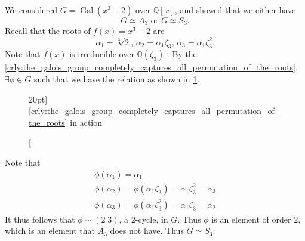 \documentclass[notoc,notitlepage,nobib]{tufte-book}
\DeclareMathOperator{\Gal}{Gal}
\begin{document}
\begin{eg}
  We considered $G = \Gal(x^3 - 2)$ over $\mathbb{Q}[x]$, and showed that we
  either have
  \begin{equation*}
    G \simeq A_3 \text{ or } G \simeq S_3.
  \end{equation*}
  Recall that the roots of $f(x) = x^3 - 2$ are
  \begin{equation*}
    \alpha_1 = \sqrt[3]{2}, \, \alpha_2 = \alpha_1 \zeta_3, \, \alpha_3 =
    \alpha_1 \zeta_3^2.
  \end{equation*}
  Note that $f(x)$ is irreducible over $\mathbb{Q}(\zeta_3)$ . By the
  \cref{crly:the_galois_group_completely_captures_all_permutation_of_the_roots},
  $\exists \phi \in G$ such that we have the relation as shown in
  \cref{fig:crly_galois_group_has_all_permutations_in_action}.
  \begin{figure}[ht]
    \centering
    \caption[][20pt]{\cref{crly:the_galois_group_completely_captures_all_permutation_of_the_roots} in action}
    \label{fig:crly_galois_group_has_all_permutations_in_action}
  \end{figure}

   Note that
  \begin{gather*}
    \phi(\alpha_1) = \alpha_1 \\
    \phi(\alpha_2) = \phi(\alpha_1 \zeta_3) = \alpha_1 \zeta_3^2 = \alpha_3 \\
    \phi(\alpha_3) = \phi(\alpha_1 \zeta_3^2) = \alpha_1 \zeta_3 = \alpha_2
  \end{gather*}
  It thus follows that $\phi \sim (2 \; 3)$, a $2$-cycle, in $G$. Thus $\phi$ is
  an element of order $2$, which is an element that $A_3$ does not have. Thus $G
  \simeq S_3$.
\end{eg}
\end{document}
